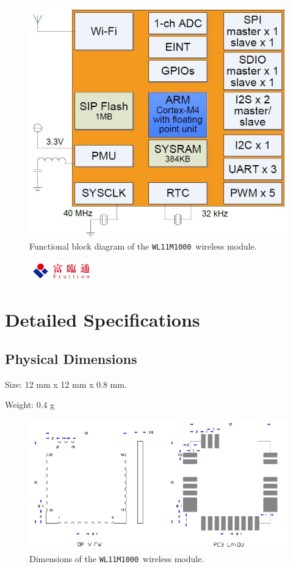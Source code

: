 \documentclass{scrreprt}
\newcommand{\pchapter}[1]{
	\begingroup\let\clearpage\relax
	\newpage
	\begin{figure}[H]
		\includegraphics[width=0.25\textwidth]{logo.jpeg}
	\end{figure}
	\chapter{#1}
	\endgroup
}
\newcommand{\modelno}{\texttt{WL11M1000}}
\begin{document}
\begin{CJK*}{UTF8}{gbsn}
\begin{figure}[H]
\includegraphics[width=\textwidth]{block.jpg}
\caption{Functional block diagram of the \modelno\ wireless module.}
\end{figure}

\pchapter{Detailed Specifications}

\section{Physical Dimensions}

Size: 12 mm x 12 mm x 0.8 mm.

Weight: 0.4 g

\begin{figure}[H]
\includegraphics[width=\textwidth]{dimensions.png}
\caption{Dimensions of the \modelno\ wireless module.}
\end{figure}


\end{CJK*}
\end{document}
